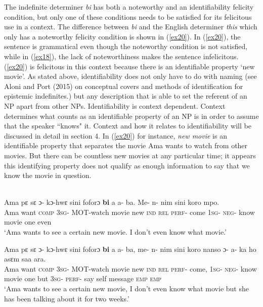 \documentclass[output=paper,modfonts]{langsci/langscibook}
\begin{document}
The indefinite determiner \emph{bi} has both a noteworthy and an identifiability felicity condition, but only one of these conditions needs to be satisfied for its felicitous use in a context. The difference between \emph{bi} and the English determiner \emph{this} which only has a noteworthy felicity condition is shown in (\ref{ex20}). In  (\ref{ex20}), the sentence is grammatical even though the noteworthy condition is not satisfied, while in (\ref{ex18}), the lack of noteworthiness makes the sentence infelicitous. (\ref{ex20}) is felicitous in this context because there is an identifiable property `new movie'. As stated above, identifiability does not only have to do with naming (see Aloni and Port (2015) on conceptual covers and methods of identification for epistemic indefinites.) but any description that is able to set the referent of an NP apart from other NPs. Identifiability is context dependent. Context determines what counts as an identifiable property of an NP is in order to assume that the speaker ``knows" it. Context and how it relates to identifiability will be discussed in detail in section 4. In (\ref{ex20}) for instance, \emph{new movie} is an identifiable property that separates the movie Ama wants to watch from other movies.  But there can be countless new movies at any particular time; it appears this identifying property does not qualify as enough information to say that we know the movie in question. 

\ea
{}\\
\ea\label{ex20}
\gll Ama pε sε ɔ- kɔ-hwε sini foforɔ \textbf{bi} a a- ba. Me- n- nim sini koro mpo.\\
Ama want \textsc{comp} \textsc{3sg}- \textsc{MOT}-watch movie new \textsc{ind} \textsc{rel} \textsc{perf}- come \textsc{1sg}- \textsc{neg}- know movie one even \\
\glt `Ama wants to see a certain new movie. I don't even know what movie.'

\ex\label{ex21}
 \gll Ama pε sε ɔ- kɔ-hwε sini foforɔ \textbf{bi} a a- ba, me- n- nim sini koro nanso ɔ- a- ka ho asεm saa ara.\\
Ama want \textsc{comp} \textsc{3sg}- \textsc{MOT}-watch movie new \textsc{ind} \textsc{rel} \textsc{perf}- come, \textsc{1sg}- \textsc{neg}- know movie one but \textsc{3sg}- \textsc{perf}- say self message \textsc{emp} \textsc{emp} \\
\glt `Ama wants to see a certain new movie, I don't even know what movie but she has been talking about it for two weeks.'
\end{document}
